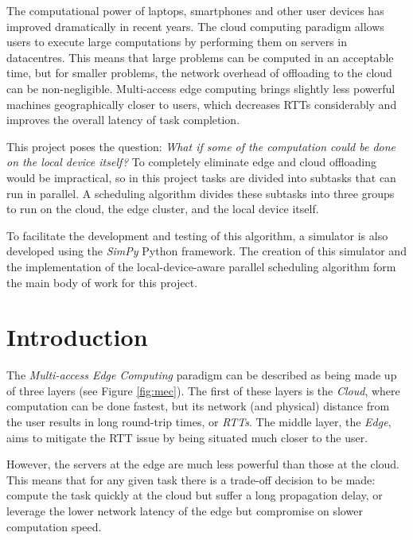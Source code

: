 \documentclass[]{UCD_CS_Interim_Report}
\begin{document}
\maketitle


\tableofcontents


\abstract
The computational power of laptops, smartphones and other user devices has improved dramatically in recent years. The cloud computing paradigm allows users to execute large computations by performing them on servers in datacentres. This means that large problems can be computed in an acceptable time, but for smaller problems, the network overhead of offloading to the cloud can be non-negligible. Multi-access edge computing brings slightly less powerful machines geographically closer to users, which decreases RTTs considerably and improves the overall latency of task completion. 

This project poses the question: \textit{What if some of the computation could be done on the local device itself?} To completely eliminate edge and cloud offloading would be impractical, so in this project tasks are divided into subtasks that can run in parallel. A scheduling algorithm divides these subtasks into three groups to run on the cloud, the edge cluster, and the local device itself.

To facilitate the development and testing of this algorithm, a simulator is also developed using the \textit{SimPy} Python framework. The creation of this simulator and the implementation of the local-device-aware parallel scheduling algorithm form the main body of work for this project.


\chapter{Introduction}
The \textit{Multi-access Edge Computing} paradigm can be described as being made up of three layers (see Figure \ref{fig:mec}). The first of these layers is the \textit{Cloud}, where computation can be done fastest, but its network (and physical) distance from the user results in long round-trip times, or \textit{RTTs}. The middle layer, the \textit{Edge}, aims to mitigate the RTT issue by being situated much closer to the user. 

However, the servers at the edge are much less powerful than those at the cloud. This means that for any given task there is a trade-off decision to be made: compute the task quickly at the cloud but suffer a long propagation delay, or leverage the lower network latency of the edge but compromise on slower computation speed.
\end{document}
